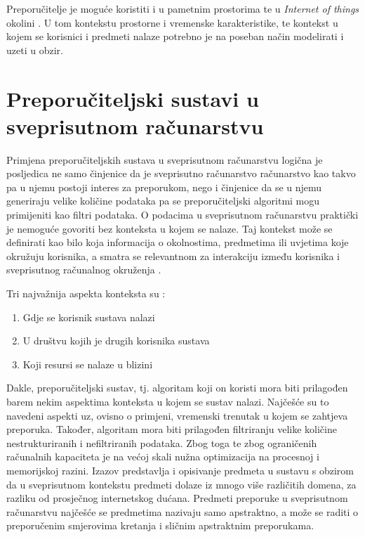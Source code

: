 \documentclass[times, utf8, diplomski, numeric]{fer}
\begin{document}
Preporučitelje je moguće koristiti i u pametnim prostorima te u \emph{Internet
of things} okolini \cite{Munoz-Organero2010}. U tom kontekstu prostorne i
vremenske karakteristike, te kontekst u kojem se korisnici i predmeti nalaze
potrebno je na poseban način modelirati i uzeti u obzir.

\section{Preporučiteljski sustavi u sveprisutnom računarstvu}
Primjena preporučiteljskih sustava u sveprisutnom računarstvu logična je
posljedica ne samo činjenice da je sveprisutno računarstvo računarstvo kao takvo
pa u njemu postoji interes za preporukom, nego i činjenice da se u njemu
generiraju velike količine podataka pa se preporučiteljski algoritmi mogu
primijeniti kao filtri podataka. O podacima u sveprisutnom računarstvu praktički
je nemoguće govoriti bez konteksta u kojem se nalaze. Taj kontekst može se
definirati kao bilo koja informacija o okolnostima, predmetima ili uvjetima
koje okružuju korisnika, a smatra se relevantnom za interakciju između
korisnika i sveprisutnog računalnog okruženja \cite{RanganathanCampbell}.

Tri najvažnija aspekta konteksta su \cite{schilit1994context}:
\begin{enumerate}
  \item Gdje se korisnik sustava nalazi
  \item U društvu kojih je drugih korisnika sustava
  \item Koji resursi se nalaze u blizini
\end{enumerate}

Dakle, preporučiteljski sustav, tj. algoritam koji on koristi mora biti
prilagođen barem nekim aspektima konteksta u kojem se sustav nalazi. Najčešće su
to navedeni aspekti uz, ovisno o primjeni, vremenski trenutak u kojem se
zahtjeva preporuka. Također, algoritam mora biti prilagođen filtriranju velike
količine nestrukturiranih i nefiltriranih podataka. Zbog toga te zbog
ograničenih računalnih kapaciteta je na većoj skali nužna optimizacija na
procesnoj i memorijskoj razini. Izazov predstavlja i opisivanje predmeta u
sustavu s obzirom da u sveprisutnom kontekstu predmeti dolaze iz mnogo više
različitih domena, za razliku od prosječnog internetskog dućana. Predmeti
preporuke u sveprisutnom računarstvu najčešće se predmetima nazivaju samo
apstraktno, a može se raditi o preporučenim smjerovima kretanja i sličnim
apstraktnim preporukama. 
\end{document}
